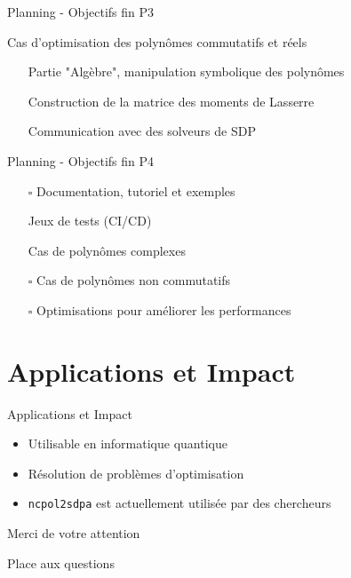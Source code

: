 \documentclass{beamer}
\begin{document}
\begin{frame}{Planning - Objectifs fin P3}

Cas d'optimisation des polynômes commutatifs et réels
\begin{itemize}
    \item[\checkmark] Partie "Algèbre", manipulation symbolique des polynômes
    \item[\checkmark] Construction de la matrice des moments de Lasserre
    \item[\checkmark] Communication avec des solveurs de SDP
\end{itemize}
\end{frame}

\begin{frame}{Planning - Objectifs fin P4}

\begin{itemize}
    \item[$\square$] Documentation, tutoriel et exemples
    \item[\checkmark] Jeux de tests (CI/CD)
    \item[\checkmark] Cas de polynômes complexes
    \item[$\square$] Cas de polynômes non commutatifs
    \item[$\square$] Optimisations pour améliorer les performances
\end{itemize}
\end{frame}

\section{Applications et Impact}

\begin{frame}{Applications et Impact}
\begin{itemize}
    \item Utilisable en informatique quantique
    \item Résolution de problèmes d'optimisation
    \item \texttt{ncpol2sdpa} est actuellement utilisée par des chercheurs
\end{itemize}
\end{frame}

\begin{frame}{Merci de votre attention}
\begin{center}
    {\Large Place aux questions}
\end{center}
\end{frame}
\end{document}
